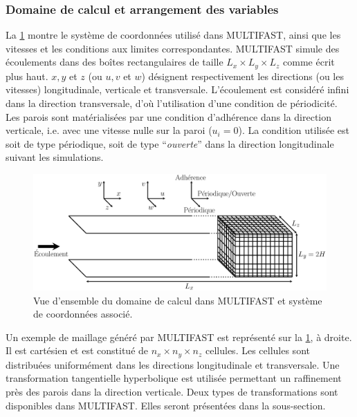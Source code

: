 \subsubsection{Domaine de calcul et arrangement des variables}
\label{subsubsec/domaine_calcul_arrangement_variables}

La \cref{fig/domaine_overview} montre le système de coordonnées utilisé dans MULTIFAST, ainsi que les vitesses et les conditions aux limites correspondantes. MULTIFAST simule des écoulements dans des boîtes rectangulaires de taille $L_{x} \times L_{y} \times L_{z}$ comme écrit plus haut. $x, y$ et $z$ (ou $u, v$ et $w$) désignent respectivement les directions (ou les vitesses) longitudinale, verticale et transversale. L'écoulement est considéré infini dans la direction transversale, d'où l'utilisation d'une condition de périodicité. Les parois sont matérialisées par une condition d'adhérence dans la direction verticale, i.e. avec une vitesse nulle sur la paroi ($u_{i}=0$). La condition utilisée est soit de type périodique, soit de type \foreignquote{french}{\textit{ouverte}} dans la direction longitudinale suivant les simulations.

\begin{figure}[!hbtp]
    \centering
    \includegraphics[width=\linewidth]{Chap2/Pictures/Domaine_calcul/Domaine_overview.pdf}
    \caption{Vue d'ensemble du domaine de calcul dans MULTIFAST et système de coordonnées associé.}
    \label{fig/domaine_overview}
\end{figure}

\vspace{2.5cm}
Un exemple de maillage généré par MULTIFAST est représenté sur la \cref{fig/domaine_overview}, à droite. Il est cartésien et est constitué de $n_{x} \times n_{y} \times n_{z}$ cellules. Les cellules sont distribuées uniformément dans les directions longitudinale et transversale. Une transformation tangentielle hyperbolique est utilisée permettant un raffinement près des parois dans la direction verticale. Deux types de transformations sont disponibles dans MULTIFAST. Elles seront présentées dans la sous-section.\\


